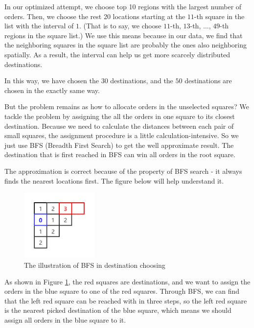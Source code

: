 \documentclass{llncs}
\begin{document}
In our optimized attempt, we choose top 10 regions with the largest number of orders. Then, we choose the rest 20 locations starting at the $11$-th square in the list with the interval of $1$. (That is to say, we choose $11$-th, $13$-th, $\dots$, $49$-th regions in the square list.) We use this means because in our data, we find that the neighboring squares in the square list are probably the ones also neighboring spatially. As a result, the interval can help us get more scarcely distributed destinations.

In this way, we have chosen the $30 $ destinations, and the $50$ destinations are chosen in the exactly same way. 

But the problem remains as how to allocate orders in the unselected squares? We tackle the problem by assigning the all the orders in one square to its closest destination. Because we need to calculate the distances between each pair of small squares, the assignment procedure is a little calculation-intensive. So we just use BFS (Breadth First Search) to get the well approximate result. The destination that is first reached in BFS can win all orders in the root square.

The approximation is correct because of the property of BFS search - it always finds the nearest locations first. The figure below will help understand it.
	\begin{figure}[htbp]
		\centering
		\includegraphics[width=1.5in]{destination_choice}
		\caption{The illustration of BFS in destination choosing}\label{fig:ill}
	\end{figure}

As shown in Figure \ref{fig:ill}, the red squares are destinations, and we want to assign the orders in the blue square to one of the red squares. Through BFS, we can find that the left red square can be reached with in three steps, so the left red square is the nearest picked destination of the blue square, which means we should assign all orders in the blue square to it.
\end{document}
